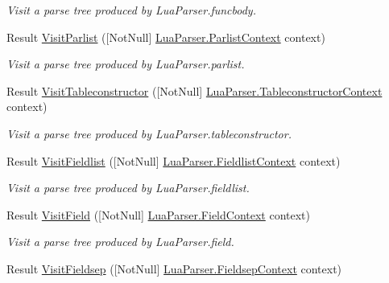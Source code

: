 \begin{DoxyCompactItemize}
\begin{DoxyCompactList}\small\item\em Visit a parse tree produced by Lua\+Parser.\+funcbody. \end{DoxyCompactList}\item 
Result \mbox{\hyperlink{interfacezlua_1_1_i_lua_visitor_a8971a5b8bc82eb9d9ddfc1509538c293}{Visit\+Parlist}} (\mbox{[}Not\+Null\mbox{]} \mbox{\hyperlink{classzlua_1_1_lua_parser_1_1_parlist_context}{Lua\+Parser.\+Parlist\+Context}} context)
\begin{DoxyCompactList}\small\item\em Visit a parse tree produced by Lua\+Parser.\+parlist. \end{DoxyCompactList}\item 
Result \mbox{\hyperlink{interfacezlua_1_1_i_lua_visitor_a8b04aaf49447f3a8883687237f88d60e}{Visit\+Tableconstructor}} (\mbox{[}Not\+Null\mbox{]} \mbox{\hyperlink{classzlua_1_1_lua_parser_1_1_tableconstructor_context}{Lua\+Parser.\+Tableconstructor\+Context}} context)
\begin{DoxyCompactList}\small\item\em Visit a parse tree produced by Lua\+Parser.\+tableconstructor. \end{DoxyCompactList}\item 
Result \mbox{\hyperlink{interfacezlua_1_1_i_lua_visitor_a5e96f0fd7b286fbdbac993c6832ee7af}{Visit\+Fieldlist}} (\mbox{[}Not\+Null\mbox{]} \mbox{\hyperlink{classzlua_1_1_lua_parser_1_1_fieldlist_context}{Lua\+Parser.\+Fieldlist\+Context}} context)
\begin{DoxyCompactList}\small\item\em Visit a parse tree produced by Lua\+Parser.\+fieldlist. \end{DoxyCompactList}\item 
Result \mbox{\hyperlink{interfacezlua_1_1_i_lua_visitor_ae8386424ca34e372ed88360de953a962}{Visit\+Field}} (\mbox{[}Not\+Null\mbox{]} \mbox{\hyperlink{classzlua_1_1_lua_parser_1_1_field_context}{Lua\+Parser.\+Field\+Context}} context)
\begin{DoxyCompactList}\small\item\em Visit a parse tree produced by Lua\+Parser.\+field. \end{DoxyCompactList}\item 
Result \mbox{\hyperlink{interfacezlua_1_1_i_lua_visitor_a9b0b2dc2b7d35b07f48b025e06b5e8e6}{Visit\+Fieldsep}} (\mbox{[}Not\+Null\mbox{]} \mbox{\hyperlink{classzlua_1_1_lua_parser_1_1_fieldsep_context}{Lua\+Parser.\+Fieldsep\+Context}} context)

\end{DoxyCompactItemize}

